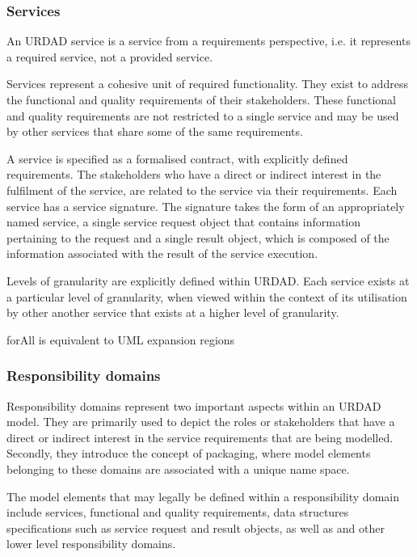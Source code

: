 \subsubsection{Services}

An URDAD service is a service from a requirements perspective, i.e. it represents a required service, not a provided service. 


Services represent a cohesive unit of required functionality. They exist to address the functional and quality requirements of their stakeholders. These functional and quality requirements are not restricted to a single service and may be used by other services that share some of the same requirements.

A service is specified as a formalised contract, with explicitly defined requirements. The stakeholders who have a direct or indirect interest in the fulfilment of the service, are related to the service via their requirements. Each service has a service signature. The signature takes the form of an appropriately named service, a single service request object that contains information pertaining to the request and a single result object, which is composed of the information associated with the result of the service execution.


Levels of granularity are explicitly defined within URDAD. Each service exists at a particular level of granularity, when viewed within the context of its utilisation by other another service that exists at a higher level of granularity.

forAll is equivalent to UML expansion regions

\subsubsection{Responsibility domains}

Responsibility domains represent two important aspects within an URDAD model. They are primarily used to depict the roles or stakeholders that have  a direct or indirect interest in the service requirements that are being modelled. Secondly, they introduce the concept of packaging, where model elements belonging to these domains are associated with a unique name space. 

The model elements that may legally be defined within a responsibility domain include services, functional and quality requirements, data structures specifications such as service request and result objects, as well as and other lower level responsibility domains.







